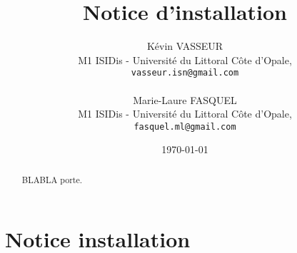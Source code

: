 \documentclass{article}
\title{Notice d'installation}
\author{K\'{e}vin VASSEUR\\
   M1 ISIDis - Universit\'{e} du Littoral C\^{o}te d'Opale,\\
   \texttt{vasseur.isn@gmail.com}\\
   \\
   Marie-Laure FASQUEL\\
   M1 ISIDis - Universit\'{e} du Littoral C\^{o}te d'Opale,\\
   \texttt{fasquel.ml@gmail.com}
}
\date{\today}
\begin{document}
	\maketitle
	\begin{abstract}
		BLABLA porte.
	\end{abstract}	
	
	\tableofcontents
	
	\section{Notice installation}
	
\end{document}
